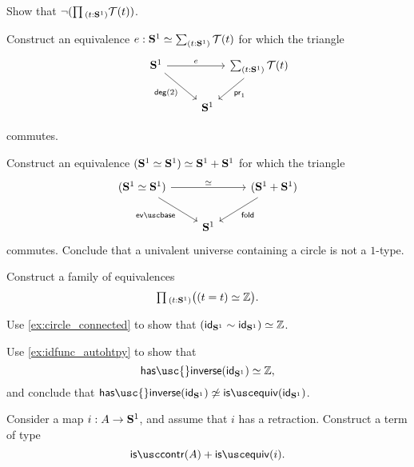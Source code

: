 \begin{exercises}
\begin{subexenum}
\item Show that $\neg(\prd{t:\sphere{1}}\mathcal{T}(t))$.
\item Construct an equivalence $e:\eqv{\sphere{1}}{\sm{t:\sphere{1}}\mathcal{T}(t)}$ for which the triangle
\begin{equation*}
\begin{tikzcd}[column sep=tiny]
\sphere{1} \arrow[rr,"e"] \arrow[dr,swap,"\mathsf{deg}(2)"] & & \sm{t:\sphere{1}}\mathcal{T}(t) \arrow[dl,"\proj 1"] \\
\phantom{\sm{t:\sphere{1}}\mathcal{T}(t)} & \sphere{1}
\end{tikzcd}
\end{equation*}
commutes.
\end{subexenum}
\exercise Construct an equivalence $\eqv{(\eqv{\sphere{1}}{\sphere{1}})}{\sphere{1}+\sphere{1}}$ for which the triangle
\begin{equation*}
  \begin{tikzcd}
    (\eqv{\sphere{1}}{\sphere{1}}) \arrow[rr,"\simeq"] \arrow[dr,swap,"\evbase"] & & (\sphere{1}+\sphere{1}) \arrow[dl,"\fold"] \\
    & \sphere{1}
  \end{tikzcd}
\end{equation*}
commutes. Conclude that a univalent universe containing a circle is not a $1$-type.
\exercise \label{ex:is_invertible_id_S1}
\begin{subexenum}
\item Construct a family of equivalences
\begin{equation*}
\prd{t:\sphere{1}} \big(\eqv{(t=t)}{\Z}\big).
\end{equation*}
\item Use \cref{ex:circle_connected} to show that $\eqv{(\idfunc[\sphere{1}]\htpy\idfunc[\sphere{1}])}{\Z}$.
\item Use \cref{ex:idfunc_autohtpy} to show that
\begin{equation*}
\eqv{\mathsf{has\usc{}inverse}(\idfunc[\sphere{1}])}{\Z},
\end{equation*}
and conclude that ${\mathsf{has\usc{}inverse}}(\idfunc[\sphere{1}])\not\simeq{\isequiv(\idfunc[\sphere{1}])}$. 
\end{subexenum}
\exercise Consider a map $i:A \to \mathbf{S}^{1}$, and assume that $i$ has a retraction. Construct a term of type
  \begin{equation*}
    \iscontr(A)+\isequiv(i).
  \end{equation*}

\end{exercises}
